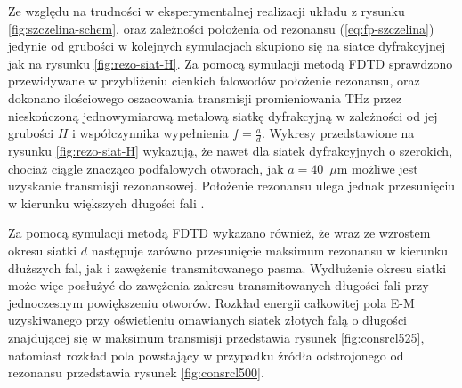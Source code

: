 Ze względu na trudności w eksperymentalnej realizacji układu z rysunku \ref{fig:szczelina-schem}, oraz zależności położenia od rezonansu (\ref{eq:fp-szczelina}) jedynie od grubości w kolejnych symulacjach skupiono się na siatce dyfrakcyjnej jak na rysunku \ref{fig:rezo-siat-H}.  Za pomocą symulacji metodą FDTD sprawdzono przewidywane w przybliżeniu cienkich falowodów położenie rezonansu, oraz dokonano ilościowego oszacowania transmisji promieniowania THz przez nieskończoną jednowymiarową metalową siatkę dyfrakcyjną w zależności od jej grubości $H$ i współczynnika wypełnienia $f=\frac{a}{d}$. Wykresy przedstawione na rysunku \ref{fig:rezo-siat-H} wykazują, że nawet dla siatek dyfrakcyjnych o szerokich, chociaż ciągle znacząco podfalowych otworach, jak $a=40$~$\mu$m możliwe jest uzyskanie transmisji rezonansowej. Położenie rezonansu ulega jednak przesunięciu w kierunku większych długości fali \cite{Szczytko2012271}.

Za pomocą symulacji metodą FDTD wykazano również, że wraz ze wzrostem okresu siatki $d$ następuje zarówno przesunięcie maksimum rezonansu w kierunku dłuższych fal, jak i zawężenie transmitowanego pasma. Wydłużenie okresu siatki może więc posłużyć do zawężenia zakresu transmitowanych długości fali przy jednoczesnym powiększeniu otworów. Rozkład energii całkowitej pola E-M uzyskiwanego przy oświetleniu omawianych siatek złotych falą o długości znajdującej się w maksimum transmisji przedstawia rysunek \ref{fig:consrcl525}, natomiast rozkład pola powstający w przypadku źródła odstrojonego od rezonansu przedstawia rysunek \ref{fig:consrcl500}.


